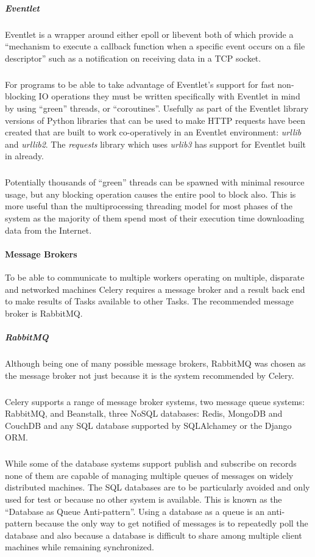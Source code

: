 \subparagraph{Eventlet}
Eventlet is a wrapper around either epoll or libevent both of which provide a ``mechanism to execute a callback function when a specific event occurs on a file descriptor'' such as a notification on receiving data in a TCP socket. 

\subparagraph{}
For programs to be able to take advantage of Eventlet's support for fast non-blocking IO operations they must be written specifically with Eventlet in mind by using ``green'' threads, or ``coroutines''.  Usefully as part of the Eventlet library versions of Python libraries that can be used to make HTTP requests have been created that are built to work co-operatively in an Eventlet environment: \emph{urllib} and \emph{urllib2}. The \emph{requests} library which uses \emph{urlib3} has support for Eventlet built in already.

\subparagraph{}
Potentially thousands of ``green'' threads can be spawned with minimal resource usage, but any blocking operation causes the entire pool to block also. This is more useful than the multiprocessing threading model for most phases of the system as the majority of them spend most of their execution time downloading data from the Internet.

\paragraph{Message Brokers}
To be able to communicate to multiple workers operating on multiple, disparate and networked machines Celery requires a message broker and a result back end to make results of Tasks available to other Tasks.  The recommended message broker is RabbitMQ.

\subparagraph{RabbitMQ}
Although being one of many possible message brokers, RabbitMQ was chosen as the message broker not just because it is the system recommended by Celery.

\subparagraph{}
Celery supports a range of message broker systems, two message queue systems: RabbitMQ, and Beanstalk, three NoSQL databases: Redis, MongoDB and CouchDB and any SQL database supported by SQLAlchamey or the Django ORM.

\subparagraph{}
While some of the database systems support publish and subscribe on records none of them are capable of managing multiple queues of messages on widely distributed machines.  The SQL databases are to be particularly avoided and only used for test or because no other system is available. This is known as the ``Database as Queue Anti-pattern''\cite{database-as-mq}.  Using a database as a queue is an anti-pattern because the only way to get notified of messages is to repeatedly poll the database and also because a database is difficult to share among multiple client machines while remaining synchronized.


